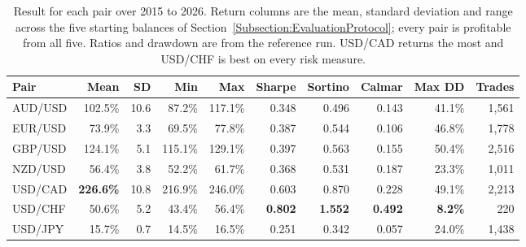 \begin{table}[htb!]
\centering
\footnotesize
\begin{tabular}{@{}lrrrrrrrrr@{}}
\toprule
\textbf{Pair} & \textbf{Mean} & \textbf{SD} & \textbf{Min} & \textbf{Max} & \textbf{Sharpe} & \textbf{Sortino} & \textbf{Calmar} & \textbf{Max DD} & \textbf{Trades} \\
\midrule
AUD/USD & 102.5\% & 10.6 & 87.2\% & 117.1\% & 0.348 & 0.496 & 0.143 & 41.1\% & 1,561 \\
EUR/USD & 73.9\% & 3.3 & 69.5\% & 77.8\% & 0.387 & 0.544 & 0.106 & 46.8\% & 1,778 \\
GBP/USD & 124.1\% & 5.1 & 115.1\% & 129.1\% & 0.397 & 0.563 & 0.155 & 50.4\% & 2,516 \\
NZD/USD & 56.4\% & 3.8 & 52.2\% & 61.7\% & 0.368 & 0.531 & 0.187 & 23.3\% & 1,011 \\
USD/CAD & \textbf{226.6\%} & 10.8 & 216.9\% & 246.0\% & 0.603 & 0.870 & 0.228 & 49.1\% & 2,213 \\
USD/CHF & 50.6\% & 5.2 & 43.4\% & 56.4\% & \textbf{0.802} & \textbf{1.552} & \textbf{0.492} & \textbf{8.2\%} & 220 \\
USD/JPY & 15.7\% & 0.7 & 14.5\% & 16.5\% & 0.251 & 0.342 & 0.057 & 24.0\% & 1,438 \\
\bottomrule
\end{tabular}
\caption{Result for each pair over 2015 to 2026. Return columns are the mean, standard deviation and range across the five starting balances of Section~\ref{Subsection:EvaluationProtocol}; every pair is profitable from all five. Ratios and drawdown are from the reference run. USD/CAD returns the most and USD/CHF is best on every risk measure.}
\label{Tables:PairResults}
\end{table}